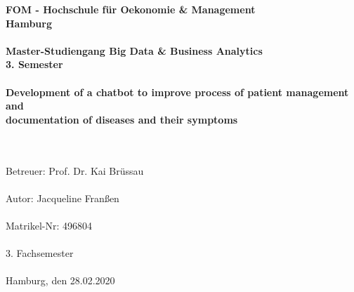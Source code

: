 		\begin{titlepage}
			\begin{center}
			\setlength{\headheight}{1.5\baselineskip}
			\renewcommand{\baselinestretch}{1.5}
					\textbf{\large FOM - Hochschule für Oekonomie \& Management \\
						Hamburg \\
						\ \\
						Master-Studiengang Big Data \& Business Analytics \\
						3. Semester \\
						\ \\
						Development of a chatbot to improve process of patient management and  \ \\		 documentation of diseases and their symptoms \ \\
						\ \\
						}
						
					\textrm{
						\ \\
						Betreuer: Prof. Dr. Kai Brüssau \\
						\ \\
						Autor: Jacqueline Franßen \\
						\ \\
						Matrikel-Nr: 496804 \\
						\ \\
						3. Fachsemester \\
						\ \\
						Hamburg, den 28.02.2020 \\
						}
			\end{center}
		\end{titlepage}

%

			\setcounter{tocdepth}{3}
			\setcounter{secnumdepth}{3}		
			\thispagestyle{empty}
			\tableofcontents
			\newpage
			\listoffigures
			\listoftables

			\thispagestyle{empty}